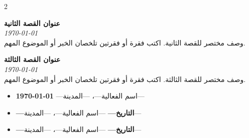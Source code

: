 \documentclass[11pt,a4paper]{article}
\begin{document}
\begin{multicols}{2}
\setlength{\columnsep}{1.5em}
\raggedright

\begin{storybox}
{\large\bfseries\color{accentdark} عنوان القصة الثانية}\\[0.2em]
{\small\itshape \today}\\[0.3em]
وصف مختصر للقصة الثانية. اكتب فقرة أو فقرتين%
تلخصان الخبر أو الموضوع المهم.
\end{storybox}

\vspace{0.4em}

\begin{storybox}
{\large\bfseries\color{accentdark} عنوان القصة الثالثة}\\[0.2em]
{\small\itshape \today}\\[0.3em]
وصف مختصر للقصة الثالثة. اكتب فقرة أو فقرتين%
تلخصان الخبر أو الموضوع المهم.
\end{storybox}

\end{multicols}

\vspace{0.5em}

\begin{eventsbox}
\begin{itemize}[topsep=0.2em,itemsep=0.25em,leftmargin=1.4em]
    \item \textbf{\today} \textemdash{} ---اسم الفعالية---، ---المدينة---
    \item \textbf{---التاريخ---} \textemdash{} ---اسم الفعالية---، ---المدينة---
    \item \textbf{---التاريخ---} \textemdash{} ---اسم الفعالية---، ---المدينة---
\end{itemize}
\end{eventsbox}

\vspace{0.5em}

\end{document}
